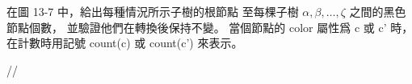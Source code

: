 \startEXERCISE
在圖 13-7 中，給出每種情況所示子樹的根節點
至每棵子樹 $\alpha,\beta,\ldots,\zeta$ 之間的黑色節點個數，
並驗證他們在轉換後保持不變。
當個節點的 color 屬性爲 c 或 c' 時，
在計數時用記號 count(c) 或 count(c') 來表示。
\stopEXERCISE

\startANSWER
//
\stopANSWER
